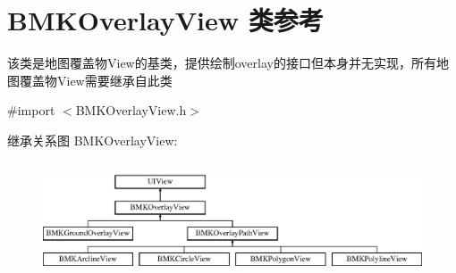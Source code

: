 \hypertarget{interface_b_m_k_overlay_view}{\section{B\-M\-K\-Overlay\-View 类参考}
\label{interface_b_m_k_overlay_view}
}


该类是地图覆盖物\-View的基类，提供绘制overlay的接口但本身并无实现，所有地图覆盖物\-View需要继承自此类  




{\ttfamily \#import $<$B\-M\-K\-Overlay\-View.\-h$>$}

继承关系图 B\-M\-K\-Overlay\-View\-:\begin{figure}[H]
\begin{center}
\leavevmode
\includegraphics[height=3.435583cm]{interface_b_m_k_overlay_view}
\end{center}
\end{figure}
